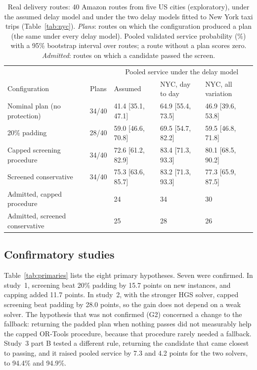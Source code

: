 \documentclass[12pt,letterpaper]{article}
\begin{document}
\begin{table}[t]
\centering
\small
\setlength{\tabcolsep}{4pt}
\caption{Real delivery routes: 40 Amazon routes from five US cities (exploratory), under the assumed delay model and under the two delay models fitted to New York taxi trips (Table~\ref{tab:nyc}). \emph{Plans}: routes on which the configuration produced a plan (the same under every delay model). Pooled validated service probability (\%) with a 95\% bootstrap interval over routes; a route without a plan scores zero. \emph{Admitted}: routes on which a candidate passed the screen.}
\label{tab:amazon}
\begin{tabular}{@{}lclll@{}}
\toprule
 & & \multicolumn{3}{c}{Pooled service under the delay model} \\
Configuration & Plans & Assumed & NYC, day to day & NYC, all variation\\
\midrule
Nominal plan (no protection) & 34/40 & 41.4 [35.1, 47.1] & 64.9 [55.4, 73.5] & 46.9 [39.6, 53.8]\\
20\% padding & 28/40 & 59.0 [46.6, 70.8] & 69.5 [54.7, 82.2] & 59.5 [46.8, 71.8]\\
Capped screening procedure & 34/40 & 72.6 [61.2, 82.9] & 83.4 [71.3, 93.3] & 80.1 [68.5, 90.2]\\
Screened conservative & 34/40 & 75.3 [63.6, 85.7] & 83.2 [71.3, 93.3] & 77.3 [65.9, 87.5]\\
\midrule
Admitted, capped procedure & & 24 & 34 & 30\\
Admitted, screened conservative & & 25 & 28 & 26\\
\bottomrule
\end{tabular}
\end{table}

\subsection{Confirmatory studies}

Table~\ref{tab:primaries} lists the eight primary hypotheses. Seven were confirmed.
In study~1, screening beat 20\% padding by 15.7 points on new instances,
and capping added 11.7 points. In study~2, with the stronger HGS solver,
capped screening beat padding by 28.0 points, so the gain does not depend
on a weak solver. The hypothesis that was not confirmed (G2) concerned a change to
the fallback: returning the padded plan when nothing passes did not measurably help
the capped OR-Tools procedure, because that procedure rarely needed a fallback.
Study~3 part B tested a different rule, returning the candidate that came closest to
passing, and it raised pooled service by 7.3 and 4.2 points for the two
solvers, to 94.4\% and 94.9\%.
\end{document}

